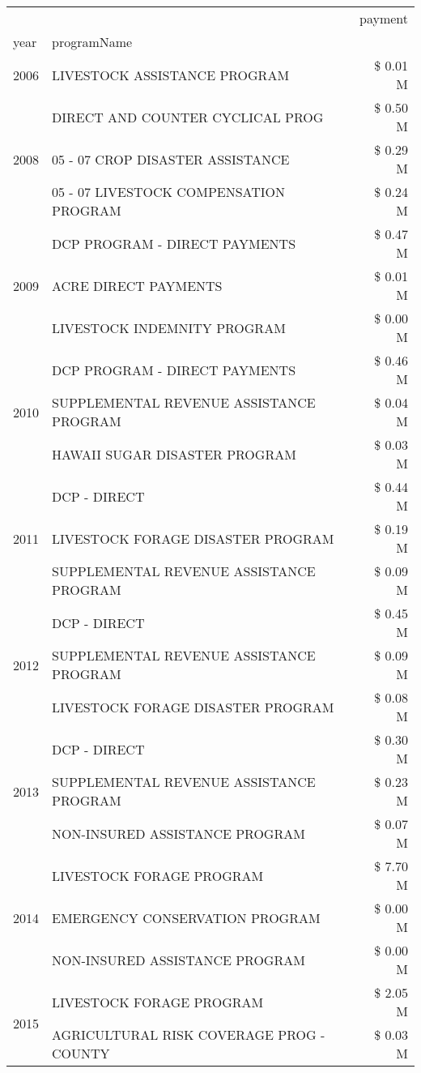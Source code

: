 \begin{tabular}{llr}
\toprule
 &  & payment \\
year & programName &  \\
\midrule
2006 & LIVESTOCK ASSISTANCE PROGRAM & \$ 0.01 M \\
\cline{1-3}
\multirow[t]{3}{*}{2008} & DIRECT AND COUNTER CYCLICAL PROG & \$ 0.50 M \\
 & 05 - 07 CROP DISASTER ASSISTANCE & \$ 0.29 M \\
 & 05 - 07 LIVESTOCK COMPENSATION PROGRAM & \$ 0.24 M \\
\cline{1-3}
\multirow[t]{3}{*}{2009} & DCP PROGRAM - DIRECT PAYMENTS & \$ 0.47 M \\
 & ACRE DIRECT PAYMENTS & \$ 0.01 M \\
 & LIVESTOCK INDEMNITY PROGRAM & \$ 0.00 M \\
\cline{1-3}
\multirow[t]{3}{*}{2010} & DCP PROGRAM - DIRECT PAYMENTS & \$ 0.46 M \\
 & SUPPLEMENTAL REVENUE ASSISTANCE PROGRAM & \$ 0.04 M \\
 & HAWAII SUGAR DISASTER PROGRAM & \$ 0.03 M \\
\cline{1-3}
\multirow[t]{3}{*}{2011} & DCP - DIRECT & \$ 0.44 M \\
 & LIVESTOCK FORAGE DISASTER PROGRAM & \$ 0.19 M \\
 & SUPPLEMENTAL REVENUE ASSISTANCE PROGRAM & \$ 0.09 M \\
\cline{1-3}
\multirow[t]{3}{*}{2012} & DCP - DIRECT & \$ 0.45 M \\
 & SUPPLEMENTAL REVENUE ASSISTANCE PROGRAM & \$ 0.09 M \\
 & LIVESTOCK FORAGE DISASTER PROGRAM & \$ 0.08 M \\
\cline{1-3}
\multirow[t]{3}{*}{2013} & DCP - DIRECT & \$ 0.30 M \\
 & SUPPLEMENTAL REVENUE ASSISTANCE PROGRAM & \$ 0.23 M \\
 & NON-INSURED ASSISTANCE PROGRAM & \$ 0.07 M \\
\cline{1-3}
\multirow[t]{3}{*}{2014} & LIVESTOCK FORAGE PROGRAM & \$ 7.70 M \\
 & EMERGENCY CONSERVATION PROGRAM & \$ 0.00 M \\
 & NON-INSURED ASSISTANCE PROGRAM & \$ 0.00 M \\
\cline{1-3}
\multirow[t]{3}{*}{2015} & LIVESTOCK FORAGE PROGRAM & \$ 2.05 M \\
 & AGRICULTURAL RISK COVERAGE PROG - COUNTY & \$ 0.03 M \\

\end{tabular}
